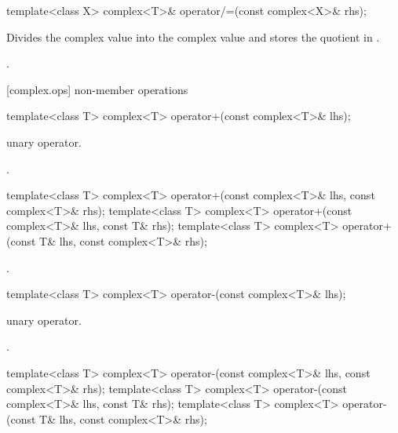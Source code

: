 %
\begin{itemdecl}
template<class X> complex<T>& operator/=(const complex<X>& rhs);
\end{itemdecl}

\begin{itemdescr}
\pnum
\effects
Divides the complex value  into the complex value
and stores the quotient in
.

\pnum
\returns
{}.
\end{itemdescr}

[complex.ops]{ non-member operations}

%
\begin{itemdecl}
template<class T> complex<T> operator+(const complex<T>& lhs);
\end{itemdecl}

\begin{itemdescr}
\pnum
\notes
unary operator.

\pnum
\returns
{}.
\end{itemdescr}

\begin{codeblock}
template<class T>
  complex<T> operator+(const complex<T>& lhs, const complex<T>& rhs);
template<class T> complex<T> operator+(const complex<T>& lhs, const T& rhs);
template<class T> complex<T> operator+(const T& lhs, const complex<T>& rhs);
\end{codeblock}

\begin{itemdescr}
\pnum
\returns
{}.
\end{itemdescr}

%
\begin{itemdecl}
template<class T> complex<T> operator-(const complex<T>& lhs);
\end{itemdecl}

\begin{itemdescr}
\pnum
\notes
unary operator.

\pnum
\returns
{}.
\end{itemdescr}

%
%
\begin{itemdecl}
template<class T>
  complex<T> operator-(const complex<T>& lhs, const complex<T>& rhs);
template<class T> complex<T> operator-(const complex<T>& lhs, const T& rhs);
template<class T> complex<T> operator-(const T& lhs, const complex<T>& rhs);
\end{itemdecl}

